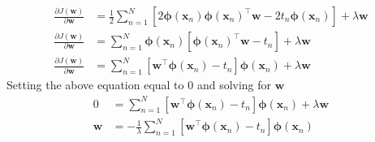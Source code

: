 \documentclass[12pt]{article}
\begin{document}
\begin{align*}
  \frac{\partial J\left(\mathbf{w}\right)}{\partial \mathbf{w}} &=
  \frac{1}{2} \sum \limits_{n=1}^N
  \left[
    2\mathbf{\phi}\left(\mathbf{x}_n\right)
    \mathbf{\phi}\left(\mathbf{x}_n\right)^\top
    \mathbf{w} -
    2t_n\mathbf{\phi}\left(\mathbf{x}_n\right)
  \right] + \lambda\mathbf{w} \\
  \frac{\partial J\left(\mathbf{w}\right)}{\partial \mathbf{w}} &=
  \sum \limits_{n=1}^N
  \mathbf{\phi}\left(\mathbf{x}_n\right)
  \left[
    \mathbf{\phi}\left(\mathbf{x}_n\right)^\top\mathbf{w} - t_n
  \right] + \lambda\mathbf{w} \\
  \frac{\partial J\left(\mathbf{w}\right)}{\partial \mathbf{w}} &=
  \sum \limits_{n=1}^N
  \left[
    \mathbf{w}^\top\mathbf{\phi}\left(\mathbf{x}_n\right) - t_n
  \right]\mathbf{\phi}\left(\mathbf{x}_n\right) + \lambda\mathbf{w}  
\end{align*}
%
Setting the above equation equal to $0$ and solving for $\mathbf{w}$
\begin{align*}
  0 &= \sum \limits_{n=1}^N
  \left[
    \mathbf{w}^\top\mathbf{\phi}\left(\mathbf{x}_n\right) - t_n
  \right]\mathbf{\phi}\left(\mathbf{x}_n\right) + \lambda\mathbf{w} \\
  \mathbf{w} &= -\frac{1}{\lambda} \sum \limits_{n=1}^N
  \left[
    \mathbf{w}^\top\mathbf{\phi}\left(\mathbf{x}_n\right) - t_n
  \right]\mathbf{\phi}\left(\mathbf{x}_n\right)
\end{align*}
\end{document}
